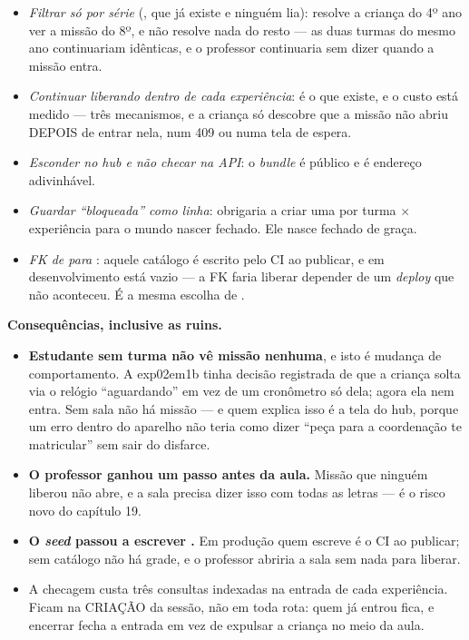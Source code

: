 \begin{itemize}
  \item \emph{Filtrar só por série} (, que já existe e
    ninguém lia): resolve a criança do 4º ano ver a missão do 8º, e não resolve
    nada do resto --- as duas turmas do mesmo ano continuariam idênticas, e o
    professor continuaria sem dizer quando a missão entra.
  \item \emph{Continuar liberando dentro de cada experiência}: é o que existe, e
    o custo está medido --- três mecanismos, e a criança só descobre que a missão
    não abriu DEPOIS de entrar nela, num 409 ou numa tela de espera.
  \item \emph{Esconder no hub e não checar na API}: o \emph{bundle} é público e
     é endereço adivinhável.
  \item \emph{Guardar \enquote{bloqueada} como linha}: obrigaria a criar uma por
    turma $\times$ experiência para o mundo nascer fechado. Ele nasce fechado de
    graça.
  \item \emph{FK de  para }: aquele catálogo é
    escrito pelo CI ao publicar, e em desenvolvimento está vazio --- a FK faria
    liberar depender de um \emph{deploy} que não aconteceu. É a mesma escolha de
    .
\end{itemize}

\textbf{Consequências, inclusive as ruins.}

\begin{itemize}
  \item \textbf{Estudante sem turma não vê missão nenhuma}, e isto é mudança de
    comportamento. A exp02em1b tinha decisão registrada de que a criança solta via o
    relógio \enquote{aguardando} em vez de um cronômetro só dela; agora ela nem
    entra. Sem sala não há missão --- e quem explica isso é a tela do hub, porque
    um erro dentro do aparelho não teria como dizer \enquote{peça para a
    coordenação te matricular} sem sair do disfarce.
  \item \textbf{O professor ganhou um passo antes da aula.} Missão que ninguém
    liberou não abre, e a sala precisa dizer isso com todas as letras --- é o
    risco novo do capítulo 19.
  \item \textbf{O \emph{seed} passou a escrever .} Em produção
    quem escreve é o CI ao publicar; sem catálogo não há grade, e o professor
    abriria a sala sem nada para liberar.
  \item A checagem custa três consultas indexadas na entrada de cada
    experiência. Ficam na CRIAÇÃO da sessão, não em toda rota: quem já entrou
    fica, e encerrar fecha a entrada em vez de expulsar a criança no meio da
    aula.
\end{itemize}


